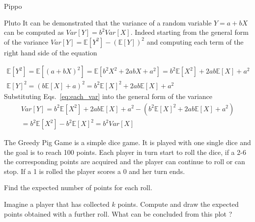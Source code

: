 \begin{question}
Pippo
\end{question}

\cprotEnv\begin{solution}
Pluto
It can be demonstrated that the variance of a random variable $Y = a + bX$ can be computed as $Var[Y] = b^2 Var[X]$. Indeed starting from the general form of the variance $Var[Y] = \mathbb{E}[Y^2] - (\mathbb{E}[Y])^2$ and computing each term of the right hand side of the equation 

\begin{equation}
\begin{gathered}
\mathbb{E}[Y^2] = \mathbb{E}[(a+bX)^2] = \mathbb{E}[b^2X^2 + 2abX + a^2] = b^2\mathbb{E}[X^2] + 2ab\mathbb{E}[X]+ a^2  \\
\mathbb{E}[Y]^2 =  (b\mathbb{E}[X] + a)^2 = b^2\mathbb{E}[X]^2 + 2ab\mathbb{E}[X]+ a^2  
\label{eq:each_var}
\end{gathered}
\end{equation}
Substituting Eqs.~\ref{eq:each_var} into the general form of the variance 
\begin{equation}
\begin{gathered}
Var[Y] = b^2\mathbb{E}[X^2] + 2ab\mathbb{E}[X]+ a^2 - (b^2\mathbb{E}[X]^2 + 2ab\mathbb{E}[X]+ a^2) \\ 
= b^2\mathbb{E}[X^2] - b^2\mathbb{E}[X]^2 = b^2 Var[X]
\end{gathered}     
\end{equation}
 

\begin{ioutput}
	
\end{ioutput}
\end{solution}

\begin{question}
\label{ex:greedy_pig}
The Greedy Pig Game is a simple dice game. It is played with one single dice and the goal is to reach 100 points. Each player in turn start to roll the dice, if a 2-6 the corresponding points are acquired and the player can continue to roll or can stop. If a 1 is rolled the player scores a 0 and her turn ends.

Find the expected number of points for each roll.

Imagine a player that has collected $k$ points. Compute and draw the expected points obtained with a further roll. What can be concluded from this plot ?
\end{question}

